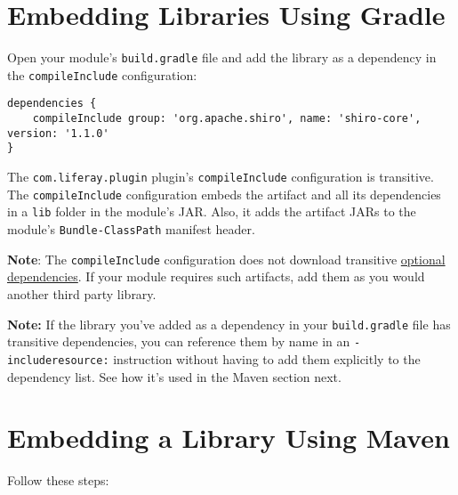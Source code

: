 \section{Embedding Libraries Using
Gradle}\label{embedding-libraries-using-gradle}

Open your module's \texttt{build.gradle} file and add the library as a
dependency in the \texttt{compileInclude} configuration:

\begin{verbatim}
dependencies {
    compileInclude group: 'org.apache.shiro', name: 'shiro-core', version: '1.1.0'
}
\end{verbatim}

The \texttt{com.liferay.plugin} plugin's \texttt{compileInclude}
configuration is transitive. The \texttt{compileInclude} configuration
embeds the artifact and all its dependencies in a \texttt{lib} folder in
the module's JAR. Also, it adds the artifact JARs to the module's
\texttt{Bundle-ClassPath} manifest header.

\textbf{Note}: The \texttt{compileInclude} configuration does not
download transitive
\href{https://maven.apache.org/guides/introduction/introduction-to-optional-and-excludes-dependencies.html}{optional
dependencies}. If your module requires such artifacts, add them as you
would another third party library.

\textbf{Note:} If the library you've added as a dependency in your
\texttt{build.gradle} file has transitive dependencies, you can
reference them by name in an \texttt{-includeresource:} instruction
without having to add them explicitly to the dependency list. See how
it's used in the Maven section next.

\section{Embedding a Library Using
Maven}\label{embedding-a-library-using-maven}

Follow these steps:

